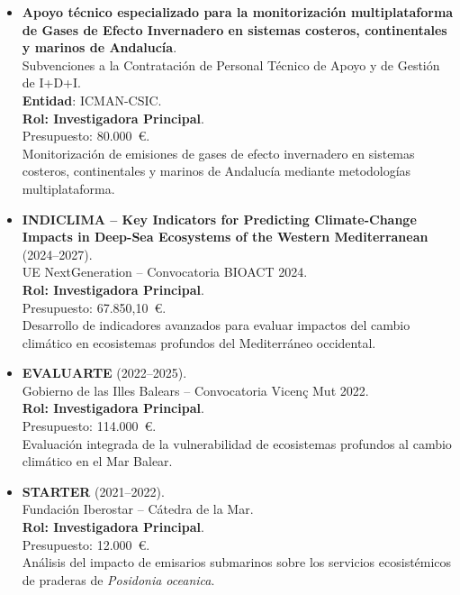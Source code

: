 \documentclass[11pt,a4paper]{article}
\begin{document}
\begin{itemize}[leftmargin=*]

    \item \textbf{Apoyo técnico especializado para la monitorización multiplataforma de Gases de Efecto Invernadero en sistemas costeros, continentales y marinos de Andalucía}.\\
    Subvenciones a la Contratación de Personal Técnico de Apoyo y de Gestión de I+D+I.\\
    \textbf{Entidad}: ICMAN-CSIC.\\
    \textbf{Rol: Investigadora Principal}.\\
    Presupuesto: 80.000~€.\\
    Monitorización de emisiones de gases de efecto invernadero en sistemas costeros, continentales y marinos de Andalucía mediante metodologías multiplataforma.

    \item \textbf{INDICLIMA -- Key Indicators for Predicting Climate-Change Impacts in Deep-Sea Ecosystems of the Western Mediterranean} (2024--2027).\\
    UE NextGeneration -- Convocatoria BIOACT 2024.\\
    \textbf{Rol: Investigadora Principal}.\\
    Presupuesto: 67.850,10~€.\\
    Desarrollo de indicadores avanzados para evaluar impactos del cambio climático en ecosistemas profundos del Mediterráneo occidental.

    \item \textbf{EVALUARTE} (2022--2025).\\
    Gobierno de las Illes Balears -- Convocatoria Vicenç Mut 2022.\\
    \textbf{Rol: Investigadora Principal}.\\
    Presupuesto: 114.000~€.\\
    Evaluación integrada de la vulnerabilidad de ecosistemas profundos al cambio climático en el Mar Balear.

    \item \textbf{STARTER} (2021--2022).\\
    Fundación Iberostar -- Cátedra de la Mar.\\
    \textbf{Rol: Investigadora Principal}.\\
    Presupuesto: 12.000~€.\\
    Análisis del impacto de emisarios submarinos sobre los servicios ecosistémicos de praderas de \textit{Posidonia oceanica}.


\end{itemize}
\end{document}
